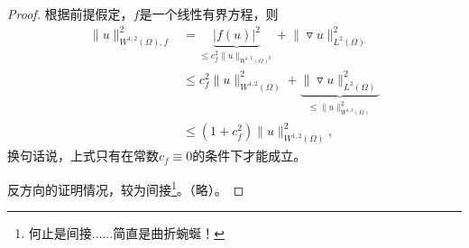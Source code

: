 \begin{proof}
  根据前提假定，$f$是一个线性有界方程，则
  \begin{equation*}
    \begin{split}
      \big\| u \big\|_{W^{1,2}(\Omega), f}^2 &= \underbrace{
      \left| f(u) \right|^2}_{\le c_f^2 \big\| u \big\|_{W^{1,2}(\Omega)^2 }} + \big\| \triangledown u \big\|^2_{L^{2}(\Omega)} \\
        & \le c_f^2 \big\| u \big\|_{W^{1,2}(\Omega)}^2   +
          \underbrace{\big\| \triangledown u \big\|^2_{L^{2}(\Omega)}}_{ \le \big\| u \big\|^2_{W^{1,2}(\Omega)}} \\
      & \le \left(1+c_f^2 \right) \big\| u \big\|^2_{W^{1,2}(\Omega)},
    \end{split}
  \end{equation*}
  换句话说，上式只有在常数$c_f \equiv 0$的条件下才能成立。

  反方向的证明情况，较为间接\footnote{何止是间接......简直是曲折蜿蜒！}。（略）。
\end{proof}
